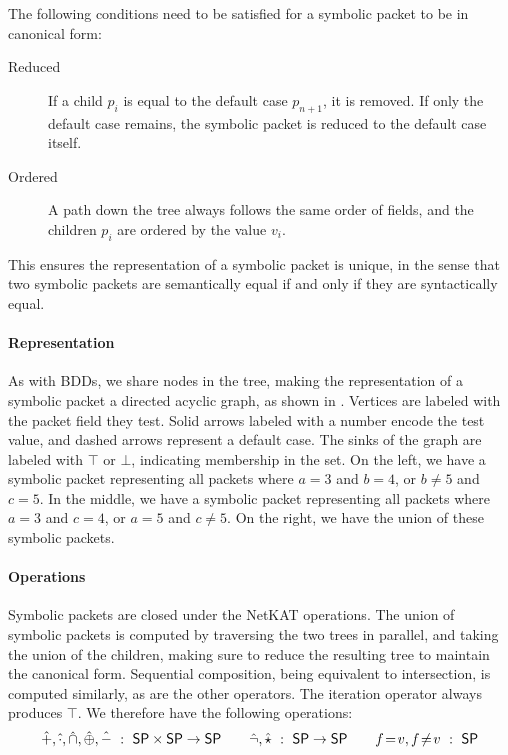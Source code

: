 \documentclass[acmsmall,dvipsnames,nonacm]{acmart}
\begin{document}
The following conditions need to be satisfied for a symbolic packet to be in canonical form:

\begin{description}
    \item[Reduced] If a child $p_i$ is equal to the default case $p_{n+1}$, it is removed. If only the default case remains, the symbolic packet is reduced to the default case itself.
    \item[Ordered] A path down the tree always follows the same order of fields, and the children $p_i$ are ordered by the value $v_i$.
\end{description}

This ensures the representation of a symbolic packet is unique, in the sense that two symbolic packets are semantically equal if and only if they are syntactically equal.

\paragraph{Representation}
As with BDDs, we share nodes in the tree, making the representation of
a symbolic packet a directed acyclic graph, as shown in
. Vertices are labeled with the packet field they
test. Solid arrows labeled with a number encode the test value, and
dashed arrows represent a default case. The sinks of the graph are
labeled with $\top$ or $\bot$, indicating membership in the set.  On
the left, we have a symbolic packet representing all packets where
$a=3$ and $b=4$, or $b \neq 5$ and $c = 5$.  In the middle, we have a
symbolic packet representing all packets where $a=3$ and $c=4$, or
$a=5$ and $c \neq 5$.  On the right, we have the union of these
symbolic packets.

\paragraph{Operations}
Symbolic packets are closed under the NetKAT operations.  The union of
symbolic packets is computed by traversing the two trees in parallel,
and taking the union of the children, making sure to reduce the
resulting tree to maintain the canonical form.  Sequential
composition, being equivalent to intersection, is computed similarly,
as are the other operators.  The iteration operator always produces
$\top$.  We therefore have the following operations:
\begin{align*}
    \hat{+}, \hat{\cdot}, \hat{\cap}, \hat{\oplus}, \hat{-}\ :\ \mathsf{SP} \times \mathsf{SP} \to \mathsf{SP} \qquad
    \hat{\neg}, \hat{\star}\ :\ \mathsf{SP} \to \mathsf{SP} \qquad
    f \mathrel{\!=\!} v, f \mathrel{\!\neq\!} v\ :\ \mathsf{SP}
\end{align*}
\end{document}
